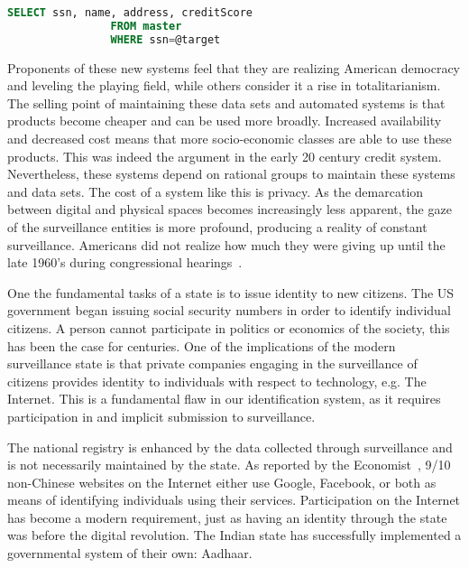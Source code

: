 \begin{lstlisting}[language=SQL, basicstyle=\sffamily]
		SELECT ssn, name, address, creditScore
				FROM master
				WHERE ssn=@target
\end{lstlisting}

Proponents of these new systems feel that they are realizing American democracy
and leveling the playing field, while others consider it a rise in
totalitarianism. The selling point of maintaining these data sets and
automated systems is that products become cheaper and can be used more broadly.
Increased availability and decreased cost means that more socio-economic
classes are able to use these products. This was indeed the argument in the
early 20 century credit system. Nevertheless, these systems depend on
rational groups to maintain these systems and data sets. The cost of a system
like this is privacy. As the demarcation between digital and physical spaces
becomes increasingly less apparent, the gaze of the surveillance entities is
more profound, producing a reality of constant surveillance. Americans did not
realize how much they were giving up until the late 1960's during congressional
hearings~\cite{lauer2017creditworthy}.

One the fundamental tasks of a state is to issue identity to new citizens.
The US government began issuing social security numbers in order to identify
individual citizens.
A person cannot participate in politics or economics of the society, this has been the case for centuries.
One of the implications of the modern
surveillance state is that private companies engaging in the surveillance of
citizens provides identity to individuals with respect to technology, e.g. The
Internet. This is a fundamental flaw in our identification system, as it
requires participation in and implicit submission to surveillance.

The national registry is enhanced by the data collected through surveillance
and is not necessarily maintained by the state. As reported by the
Economist~\cite{identity2018economist}, 9/10
non-Chinese websites on the Internet either use Google, Facebook, or both as means of
identifying individuals using their services. Participation on the Internet has
become a modern requirement, just as having an identity through the state was
before the digital revolution. The Indian state has successfully implemented
a governmental system of their own: Aadhaar.

